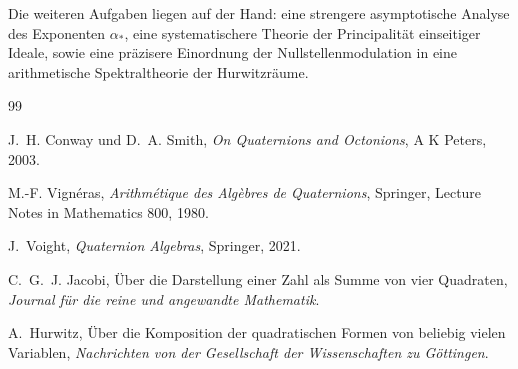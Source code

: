 \documentclass[a4paper,12pt]{article}
\theoremstyle{definition}
\numberwithin{equation}{section}
\begin{document}
	Die weiteren Aufgaben liegen auf der Hand: eine strengere asymptotische Analyse des Exponenten \(\alpha_\ast\), eine systematischere Theorie der Principalität einseitiger Ideale, sowie eine präzisere Einordnung der Nullstellenmodulation in eine arithmetische Spektraltheorie der Hurwitzräume.
	
	\begin{thebibliography}{99}
		
		J.~H. Conway und D.~A. Smith,
		\emph{On Quaternions and Octonions},
		A K Peters, 2003.
		
		M.-F. Vign\'eras,
		\emph{Arithm\'etique des Alg\`ebres de Quaternions},
		Springer, Lecture Notes in Mathematics 800, 1980.
		
		J.~Voight,
		\emph{Quaternion Algebras},
		Springer, 2021.
		
		C.~G.~J. Jacobi,
		Über die Darstellung einer Zahl als Summe von vier Quadraten,
		\emph{Journal für die reine und angewandte Mathematik}.
		
		A.~Hurwitz,
		Über die Komposition der quadratischen Formen von beliebig vielen Variablen,
		\emph{Nachrichten von der Gesellschaft der Wissenschaften zu Göttingen}.
		
	\end{thebibliography}
	
\end{document}

